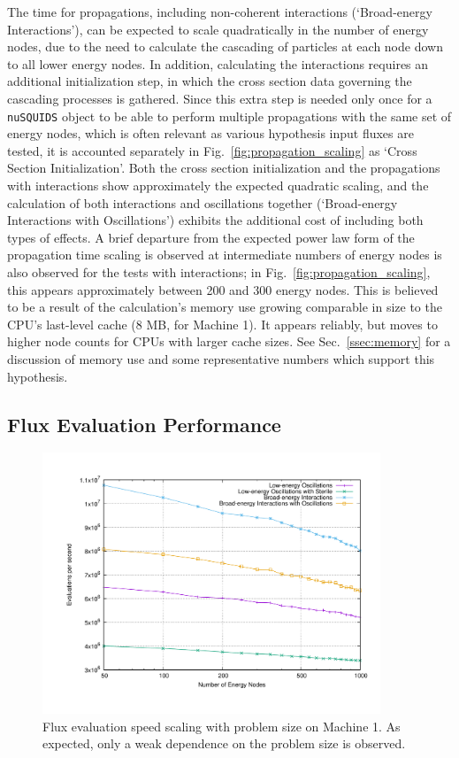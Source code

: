 \documentclass[3p,12pt]{elsarticle}
\begin{document}
The time for propagations, including non-coherent interactions (`Broad-energy Interactions'), can be expected to scale quadratically in the number of energy nodes, due to the need to calculate the cascading of particles at each node down to all lower energy nodes. 
In addition, calculating the interactions requires an additional initialization step, in which the cross section data governing the cascading processes is gathered. 
Since this extra step is needed only once for a \lstinline{nuSQUIDS} object to be able to perform multiple propagations with the same set of energy nodes, which is often relevant as various hypothesis input fluxes are tested, it is accounted separately in Fig.~\ref{fig:propagation_scaling} as `Cross Section Initialization'. 
Both the cross section initialization and the propagations with interactions show approximately the expected quadratic scaling, and the calculation of both interactions and oscillations together (`Broad-energy Interactions with Oscillations') exhibits the additional cost of including both types of effects. 
A brief departure from the expected power law form of the propagation time scaling is observed at intermediate numbers of energy nodes is also observed for the tests with interactions; in Fig.~\ref{fig:propagation_scaling}, this appears approximately between 200 and 300 energy nodes. 
This is believed to be a result of the calculation's memory use growing comparable in size to the CPU's last-level cache (8 MB, for Machine 1). 
It appears reliably, but moves to higher node counts for CPUs with larger cache sizes. 
See Sec.~\ref{ssec:memory} for a discussion of memory use and some representative numbers which support this hypothesis. 

\subsection{Flux Evaluation Performance}

\begin{figure}[t]
  \centering
  \includegraphics[width=0.9\textwidth]{fig/evaluation-scaling.pdf}
  \caption{Flux evaluation speed scaling with problem size on Machine 1. As expected, only a weak dependence on the problem size is observed. }
  \label{fig:evaluation_scaling}
\end{figure}
\end{document}

